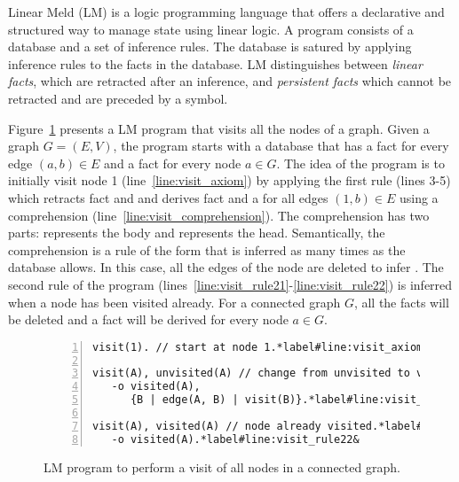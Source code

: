 Linear Meld (LM) is a logic programming language that offers a declarative and
structured way to manage state using linear logic. A program consists of a
database and a set of inference rules. The database is satured by applying
inference rules to the facts in the database. LM distinguishes between
\emph{linear facts}, which are retracted after an inference, and
\emph{persistent facts} which cannot be retracted and are preceded by a
\code{\bang} symbol.

Figure~\ref{code:visit} presents a LM program that visits all the nodes of a
graph. Given a graph $G = (E, V)$, the program starts with a database that has a
fact  for every edge $(a, b) \in E$ and a fact
 for every node $a \in G$. The idea of the program is to
initially visit node 1 (line~\ref{line:visit_axiom}) by applying the first rule
(lines 3-5) which retracts fact  and  and
derives fact  and a  for all edges $(1, b) \in
E$ using a comprehension (line~\ref{line:visit_comprehension}). The
comprehension has two parts:  represents the body and
 represents the head. Semantically, the comprehension is a rule
of the form  that is inferred as many times
as the database allows. In this case, all the edges of the node are deleted to
infer . The second rule of the program
(lines~\ref{line:visit_rule21}-\ref{line:visit_rule22}) is inferred when a node
has been visited already. For a connected graph $G$, all the 
facts will be deleted and a fact  will be derived for every
node $a \in G$.

\begin{figure}[h]
\begin{Verbatim}[numbers=left,commandchars=\*\#\&,fontsize=\stuffsize,xleftmargin=\stuffleftmargin]
visit(1). // start at node 1.*label#line:visit_axiom&

visit(A), unvisited(A) // change from unvisited to visited.
   -o visited(A),
      {B | edge(A, B) | visit(B)}.*label#line:visit_comprehension&
 
visit(A), visited(A) // node already visited.*label#line:visit_rule21&
   -o visited(A).*label#line:visit_rule22&
\end{Verbatim}
\caption{LM program to perform a visit of all nodes in a connected graph.}
  \label{code:visit}
\vspace{-5mm}
\end{figure}

